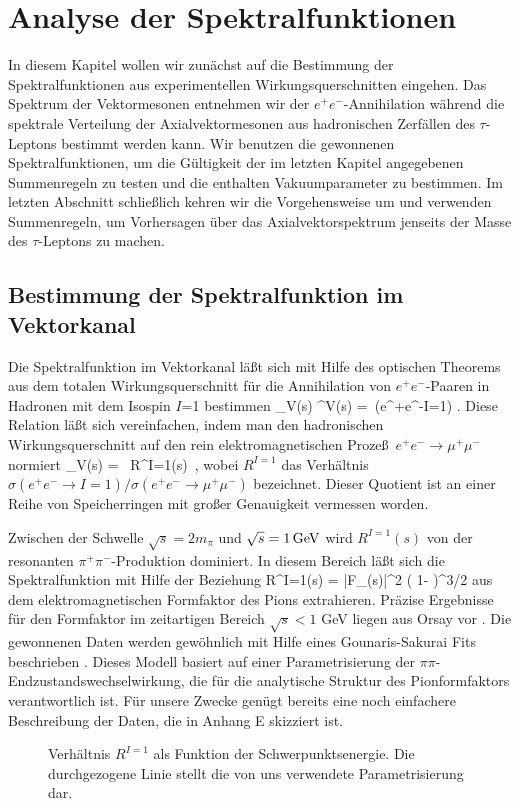 \chapter{Analyse der Spektralfunktionen}
In diesem Kapitel wollen wir zun\"achst auf die Bestimmung der 
Spektralfunktionen aus experimentellen Wirkungsquerschnitten eingehen.
Das Spektrum der Vektormesonen entnehmen wir der $e^+e^-$-Annihilation
w\"ahrend die spektrale Verteilung der Axialvektormesonen aus 
hadronischen Zerf\"allen des $\tau$-Leptons bestimmt werden kann.
Wir benutzen die gewonnenen Spektralfunktionen, 
um die G\"ultigkeit der im letzten Kapitel angegebenen Summenregeln
zu testen und die enthalten Vakuumparameter zu bestimmen. Im
letzten Abschnitt schlie\ss lich kehren wir die Vorgehensweise
um und verwenden Summenregeln, um Vorhersagen \"uber das 
Axialvektorspektrum jenseits der Masse des $\tau$-Leptons zu 
machen.   

\section{Bestimmung der Spektralfunktion im Vektorkanal}
Die Spektralfunktion im Vektorkanal l\"a\ss t sich mit Hilfe 
des optischen Theorems aus dem totalen Wirkungsquerschnitt
f\"ur die Annihilation von $e^+e^-$-Paaren in Hadronen 
mit dem Isospin $I$=1 bestimmen
\be
\label{opttheo}
\rho_V(s) \equiv {}\Pi^V(s) = 
   \,\sigma (e^+e^-\to I=1) .
\ee
Diese Relation l\"a\ss t sich vereinfachen, indem man den
hadronischen Wirkungsquerschnitt auf den rein     
elektromagnetischen Proze\ss\ $e^+e^-\to\mu^+\mu^-$
normiert
\be
\label{rhov}
 \rho_V(s) =  \, R^{I=1}(s)\, ,
\ee
wobei $R^{I=1}$ das Verh\"altnis $\sigma (e^+e^-\to I=1)/
\sigma (e^+e^-\to\mu^+\mu^-)$ bezeichnet. Dieser Quotient
ist an einer Reihe von Speicherringen mit gro\ss er 
Genauigkeit vermessen worden.

Zwischen der Schwelle $\sqrt s=2m_\pi$ und $\sqrt s=1\,\rm GeV$ wird
$R^{I=1}(s)$ von der resonanten $\pi^+\pi^-$-Produktion dominiert.
In diesem Bereich l\"a\ss t sich die Spektralfunktion mit Hilfe
der Beziehung 
\be
 R^{I=1}(s) =  |F_\pi (s)|^2 \left( 
       1- \right)^{3/2}
\ee       
aus dem elektromagnetischen Formfaktor des Pions extrahieren. 
Pr\"azise Ergebnisse f\"ur den Formfaktor im zeitartigen Bereich 
$\sqrt s<1$ GeV liegen aus Orsay vor \cite{Que78}. Die gewonnenen 
Daten werden gew\"ohnlich mit Hilfe eines Gounaris-Sakurai Fits
beschrieben \cite{Hoe83}. Dieses Modell basiert auf einer 
Parametrisierung der $\pi\pi$-Endzustandswechsel\-wir\-kung, die
f\"ur die analytische Struktur des Pionformfaktors verantwortlich ist.
F\"ur unsere Zwecke gen\"ugt bereits eine noch einfachere 
Beschreibung der Daten, die in Anhang E skizziert ist.
\begin{figure}
\caption{Verh\"altnis $R^{I=1}$ als Funktion der Schwerpunktsenergie. 
Die durchgezogene Linie stellt die von uns verwendete 
Parametrisierung dar.}
\vspace{9cm}
\end{figure}

